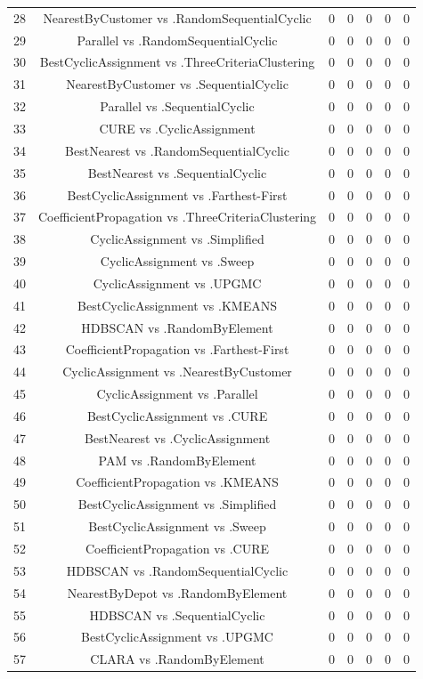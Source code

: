 \documentclass[a4paper,10pt]{article}
\begin{document}
\begin{landscape}
\begin{table}[!htp]
\begin{tabular}{ccccccc}
28&NearestByCustomer vs .RandomSequentialCyclic&0&0&0&0&0\\
29&Parallel vs .RandomSequentialCyclic&0&0&0&0&0\\
30&BestCyclicAssignment vs .ThreeCriteriaClustering&0&0&0&0&0\\
31&NearestByCustomer vs .SequentialCyclic&0&0&0&0&0\\
32&Parallel vs .SequentialCyclic&0&0&0&0&0\\
33&CURE vs .CyclicAssignment&0&0&0&0&0\\
34&BestNearest vs .RandomSequentialCyclic&0&0&0&0&0\\
35&BestNearest vs .SequentialCyclic&0&0&0&0&0\\
36&BestCyclicAssignment vs .Farthest-First&0&0&0&0&0\\
37&CoefficientPropagation vs .ThreeCriteriaClustering&0&0&0&0&0\\
38&CyclicAssignment vs .Simplified&0&0&0&0&0\\
39&CyclicAssignment vs .Sweep&0&0&0&0&0\\
40&CyclicAssignment vs .UPGMC&0&0&0&0&0\\
41&BestCyclicAssignment vs .KMEANS&0&0&0&0&0\\
42&HDBSCAN vs .RandomByElement&0&0&0&0&0\\
43&CoefficientPropagation vs .Farthest-First&0&0&0&0&0\\
44&CyclicAssignment vs .NearestByCustomer&0&0&0&0&0\\
45&CyclicAssignment vs .Parallel&0&0&0&0&0\\
46&BestCyclicAssignment vs .CURE&0&0&0&0&0\\
47&BestNearest vs .CyclicAssignment&0&0&0&0&0\\
48&PAM vs .RandomByElement&0&0&0&0&0\\
49&CoefficientPropagation vs .KMEANS&0&0&0&0&0\\
50&BestCyclicAssignment vs .Simplified&0&0&0&0&0\\
51&BestCyclicAssignment vs .Sweep&0&0&0&0&0\\
52&CoefficientPropagation vs .CURE&0&0&0&0&0\\
53&HDBSCAN vs .RandomSequentialCyclic&0&0&0&0&0\\
54&NearestByDepot vs .RandomByElement&0&0&0&0&0\\
55&HDBSCAN vs .SequentialCyclic&0&0&0&0&0\\
56&BestCyclicAssignment vs .UPGMC&0&0&0&0&0\\
57&CLARA vs .RandomByElement&0&0&0&0&0\\

\end{tabular}
\end{table}
\end{landscape}
\end{document}
